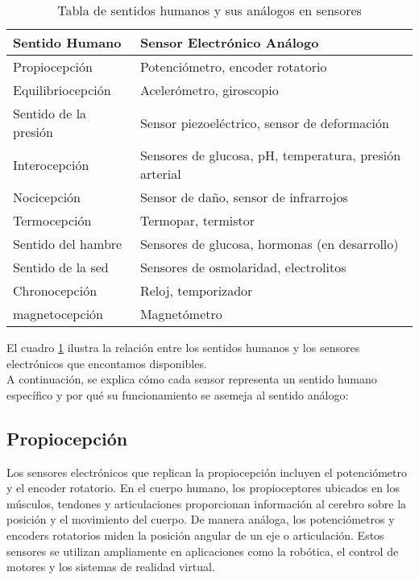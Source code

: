 \documentclass[conference]{IEEEtran}
\begin{document}
\begin{table}[H]
\centering
\caption{Tabla de sentidos humanos y sus análogos en sensores}
\label{tabla:sentidos_sensores}
\begin{tabular}{|p{3cm}|p{4cm}|}
\hline
\textbf{Sentido Humano} & \textbf{Sensor Electrónico Análogo}  \\
\hline
Propiocepción & Potenciómetro, encoder rotatorio  \\
Equilibriocepción & Acelerómetro, giroscopio  \\
Sentido de la presión & Sensor piezoeléctrico, sensor de deformación  \\
Interocepción & Sensores de glucosa, pH, temperatura, presión arterial  \\
Nocicepción & Sensor de daño, sensor de infrarrojos  \\
Termocepción & Termopar, termistor \\
Sentido del hambre & Sensores de glucosa, hormonas (en desarrollo)  \\
Sentido de la sed & Sensores de osmolaridad, electrolitos  \\
Chronocepción & Reloj, temporizador  \\
magnetocepción & Magnetómetro \\
\hline
\end{tabular}
\end{table}

El cuadro \ref{tabla:sentidos_sensores} ilustra la relación entre los sentidos humanos y los sensores electrónicos que encontamos disponibles.\\  

A continuación, se explica cómo cada sensor representa un sentido humano específico y por qué su funcionamiento se asemeja al sentido análogo:\\

\subsection{Propiocepción}

Los sensores electrónicos que replican la propiocepción incluyen el potenciómetro y el encoder rotatorio. En el cuerpo humano, los propioceptores ubicados en los músculos, tendones y articulaciones proporcionan información al cerebro sobre la posición y el movimiento del cuerpo. De manera análoga, los potenciómetros y encoders rotatorios miden la posición angular de un eje o articulación. Estos sensores se utilizan ampliamente en aplicaciones como la robótica, el control de motores y los sistemas de realidad virtual.\\
\end{document}

